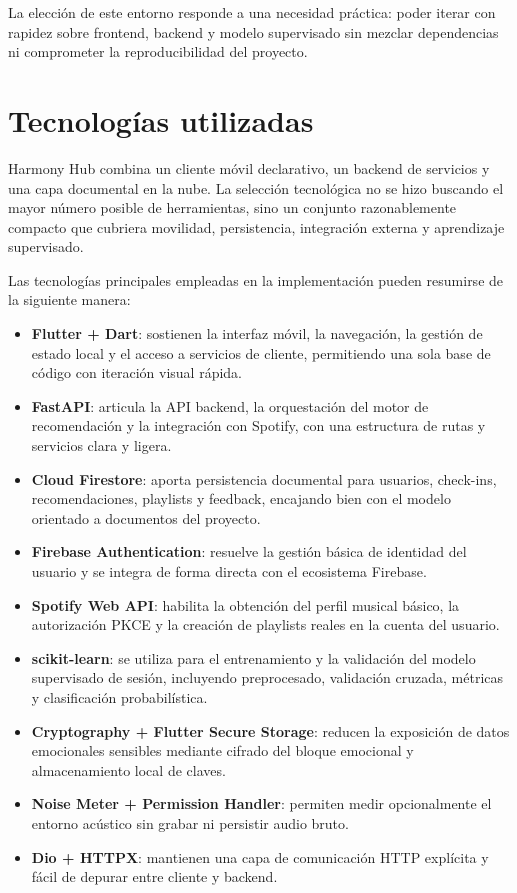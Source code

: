 La elección de este entorno responde a una necesidad práctica: poder iterar con
rapidez sobre frontend, backend y modelo supervisado sin mezclar dependencias
ni comprometer la reproducibilidad del proyecto.

\section{Tecnologías utilizadas}
\label{sec:tecnologias}

Harmony Hub combina un cliente móvil declarativo, un backend de servicios y una
capa documental en la nube. La selección tecnológica no se hizo buscando el
mayor número posible de herramientas, sino un conjunto razonablemente compacto
que cubriera movilidad, persistencia, integración externa y aprendizaje
supervisado.

Las tecnologías principales empleadas en la implementación pueden resumirse de
la siguiente manera:

\begin{itemize}
\item \textbf{Flutter + Dart}: sostienen la interfaz móvil, la navegación, la gestión de estado local y el acceso a servicios de cliente, permitiendo una sola base de código con iteración visual rápida.
\item \textbf{FastAPI}: articula la API backend, la orquestación del motor de recomendación y la integración con Spotify, con una estructura de rutas y servicios clara y ligera.
\item \textbf{Cloud Firestore}: aporta persistencia documental para usuarios, check-ins, recomendaciones, playlists y feedback, encajando bien con el modelo orientado a documentos del proyecto.
\item \textbf{Firebase Authentication}: resuelve la gestión básica de identidad del usuario y se integra de forma directa con el ecosistema Firebase.
\item \textbf{Spotify Web API}: habilita la obtención del perfil musical básico, la autorización PKCE y la creación de playlists reales en la cuenta del usuario.
\item \textbf{scikit-learn}: se utiliza para el entrenamiento y la validación del modelo supervisado de sesión, incluyendo preprocesado, validación cruzada, métricas y clasificación probabilística.
\item \textbf{Cryptography + Flutter Secure Storage}: reducen la exposición de datos emocionales sensibles mediante cifrado del bloque emocional y almacenamiento local de claves.
\item \textbf{Noise Meter + Permission Handler}: permiten medir opcionalmente el entorno acústico sin grabar ni persistir audio bruto.
\item \textbf{Dio + HTTPX}: mantienen una capa de comunicación HTTP explícita y fácil de depurar entre cliente y backend.
\end{itemize}

